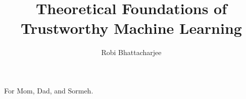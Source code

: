 \documentclass[12pt]{ucsddissertation}
\title{Theoretical Foundations of Trustworthy Machine Learning}
\author{Robi Bhattacharjee}
\begin{document}
\frontmatter
\maketitle
\makecopyright
\makesignature
\begin{dedication}
\setsinglespacing
\raggedright %
\parindent0pt\parskip\baselineskip
For Mom, Dad, and Sormeh.  
\end{dedication}

%
%

\tableofcontents
\listoffigures
\listoftables

\end{document}

